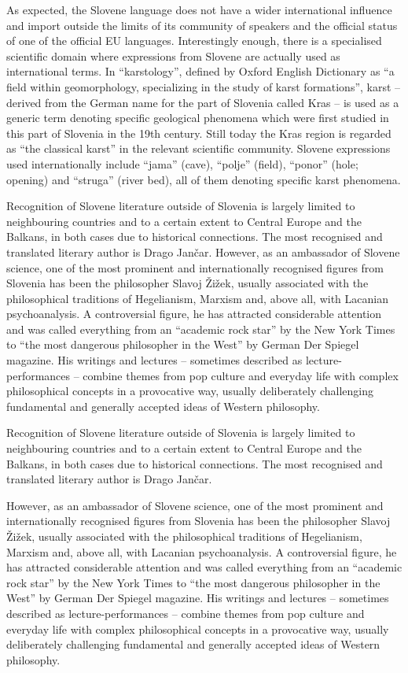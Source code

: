 \begin{multicols}{2}
As expected, the Slovene language does not have a wider international influence and import outside the limits of its community of speakers and the official status of one of the official EU languages. Interestingly enough, there is a specialised scientific domain where expressions from Slovene are actually used as international terms. In ``karstology'', defined by Oxford English Dictionary as ``a field within geomorphology, specializing in the study of karst formations'', karst – derived from the German name for the part of Slovenia called Kras – is used as a generic term denoting specific geological phenomena which were first studied in this part of Slovenia in the 19th century. Still today the Kras region is regarded as ``the classical karst'' in the relevant scientific community. Slovene expressions used internationally include ``jama'' (cave), ``polje'' (field), ``ponor'' (hole; opening) and ``struga'' (river bed), all of them denoting specific karst phenomena.


Recognition of Slovene literature outside of Slovenia is largely limited to neighbouring countries and to a certain extent to Central Europe and the Balkans, in both cases due to historical connections. The most recognised and translated literary author is Drago Jančar. However, as an ambassador of Slovene science, one of the most prominent and internationally recognised figures from Slovenia has been the philosopher Slavoj Žižek, usually associated with the philosophical traditions of Hegelianism, Marxism and, above all, with Lacanian psychoanalysis. A controversial figure, he has attracted considerable attention and was called everything from an “academic rock star” by the New York Times to ``the most dangerous philosopher in the West'' by German Der Spiegel magazine. His writings and lectures – sometimes described as lecture-performances – combine themes from pop culture and everyday life with complex philosophical concepts in a provocative way, usually deliberately challenging fundamental and generally accepted ideas of Western philosophy. 

Recognition of Slovene literature outside of Slovenia is largely limited to neighbouring countries and to a certain extent to Central Europe and the Balkans, in both cases due to historical connections. The most recognised and translated literary author is Drago Jančar. 

However, as an ambassador of Slovene science, one of the most prominent and internationally recognised figures from Slovenia has been the philosopher Slavoj Žižek,
usually associated with the philosophical traditions of Hegelianism, Marxism and, above all, with Lacanian psychoanalysis. A controversial figure, he has attracted considerable attention and was called everything from an “academic rock star” by the New York Times to ``the most dangerous philosopher in the West'' by German Der Spiegel magazine. His writings and lectures – sometimes described as lecture-performances – combine themes from pop culture and everyday life with complex philosophical concepts in a provocative way, usually deliberately challenging fundamental and generally accepted ideas of Western philosophy. 


\end{multicols}
